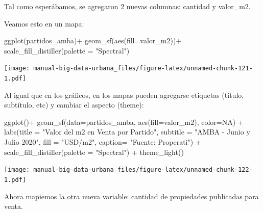 \documentclass[
  spanish,
]{book}
\newenvironment{Shaded}{\begin{snugshade}}{\end{snugshade}}
\newcommand{\AttributeTok}[1]{\textcolor[rgb]{0.77,0.63,0.00}{#1}}
\newcommand{\ConstantTok}[1]{\textcolor[rgb]{0.00,0.00,0.00}{#1}}
\newcommand{\FunctionTok}[1]{\textcolor[rgb]{0.00,0.00,0.00}{#1}}
\newcommand{\NormalTok}[1]{#1}
\newcommand{\SpecialCharTok}[1]{\textcolor[rgb]{0.00,0.00,0.00}{#1}}
\newcommand{\StringTok}[1]{\textcolor[rgb]{0.31,0.60,0.02}{#1}}
\begin{document}
Tal como esperábamos, se agregaron 2 nuevas columnas: cantidad y valor\_m2.

Veamos esto en un mapa:

\begin{Shaded}
\begin{Highlighting}[]
\FunctionTok{ggplot}\NormalTok{(partidos\_amba)}\SpecialCharTok{+}
  \FunctionTok{geom\_sf}\NormalTok{(}\FunctionTok{aes}\NormalTok{(}\AttributeTok{fill=}\NormalTok{valor\_m2))}\SpecialCharTok{+}
  \FunctionTok{scale\_fill\_distiller}\NormalTok{(}\AttributeTok{palette =} \StringTok{"Spectral"}\NormalTok{)}
\end{Highlighting}
\end{Shaded}

\texttt{[image: manual-big-data-urbana\_files/figure-latex/unnamed-chunk-121-1.pdf]}

Al igual que en los gráficos, en los mapas pueden agregarse etiquetas (título, subtítulo, etc) y cambiar el aspecto (theme):

\begin{Shaded}
\begin{Highlighting}[]
\FunctionTok{ggplot}\NormalTok{()}\SpecialCharTok{+}
  \FunctionTok{geom\_sf}\NormalTok{(}\AttributeTok{data=}\NormalTok{partidos\_amba, }\FunctionTok{aes}\NormalTok{(}\AttributeTok{fill=}\NormalTok{valor\_m2), }\AttributeTok{color=}\ConstantTok{NA}\NormalTok{) }\SpecialCharTok{+}
    \FunctionTok{labs}\NormalTok{(}\AttributeTok{title =} \StringTok{"Valor del m2 en Venta por Partido"}\NormalTok{,}
         \AttributeTok{subtitle =} \StringTok{"AMBA {-} Junio y Julio 2020"}\NormalTok{,}
         \AttributeTok{fill =} \StringTok{"USD/m2"}\NormalTok{,}
         \AttributeTok{caption=} \StringTok{"Fuente: Properati"}\NormalTok{) }\SpecialCharTok{+}
  \FunctionTok{scale\_fill\_distiller}\NormalTok{(}\AttributeTok{palette =} \StringTok{"Spectral"}\NormalTok{) }\SpecialCharTok{+}
  \FunctionTok{theme\_light}\NormalTok{()}
\end{Highlighting}
\end{Shaded}

\texttt{[image: manual-big-data-urbana\_files/figure-latex/unnamed-chunk-122-1.pdf]}

Ahora mapiemos la otra nueva variable: cantidad de propiedades publicadas para venta.
\end{document}

